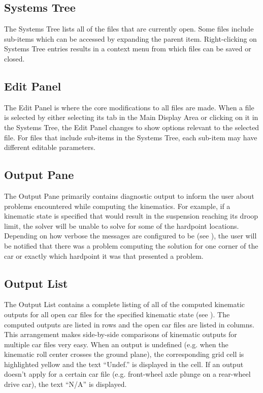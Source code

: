 \subsection{Systems Tree} \label{ssec:systemsTree}

The Systems Tree lists all of the files that are currently open.  Some files include sub-items which can be accessed by expanding the parent item.  Right-clicking on Systems Tree entries results in a context menu from which files can be saved or closed.

\subsection{Edit Panel} \label{ssec:editPanel}

The Edit Panel is where the core modifications to all files are made.  When a file is selected by either selecting its tab in the Main Display Area or clicking on it in the Systems Tree, the Edit Panel changes to show options relevant to the selected file.  For files that include sub-items in the Systems Tree, each sub-item may have different editable parameters.

\subsection{Output Pane} \label{ssec:outputPane}

The Output Pane primarily contains diagnostic output to inform the user about problems encountered while computing the kinematics.  For example, if a kinematic state is specified that would result in the suspension reaching its droop limit, the solver will be unable to solve for some of the hardpoint locations.  Depending on how verbose the messages are configured to be (see ), the user will be notified that there was a problem computing the solution for one corner of the car or exactly which hardpoint it was that presented a problem.

\subsection{Output List} \label{ssec:outputList}

The Output List contains a complete listing of all of the computed kinematic outputs for all open car files for the specified kinematic state (see ).  The computed outputs are listed in rows and the open car files are listed in columns.  This arrangement makes side-by-side comparisons of kinematic outputs for multiple car files very easy.  When an output is undefined (e.g. when the kinematic roll center crosses the ground plane), the corresponding grid cell is highlighted yellow and the text ``Undef.'' is displayed in the cell.  If an output doesn't apply for a certain car file (e.g. front-wheel axle plunge on a rear-wheel drive car), the text ``N/A'' is displayed.

